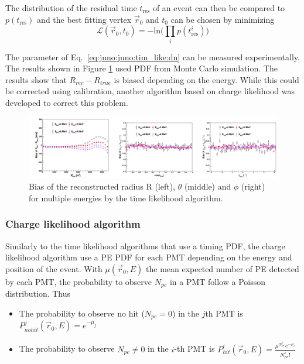 \documentclass[../main.tex]{subfiles}
\begin{document}
The distribution of the residual time $t_{\mathrm{res}}$ of an event can then be compared to $p(t_{\mathrm{res}})$ and the best fitting vertex $\vec{r}_0$ and $t_0$ can be chosen by minimizing
\begin{equation}
  \mathcal{L}(\vec{r}_0, t_0) = - \mathrm{ln} \bigg(\prod_i p(t^i_{\mathrm{res}}) \bigg)
\end{equation}

The parameter of Eq.\ \ref{eq:juno:juno:tim_like:dn} can be measured experimentally. The results shown in Figure \ref{fig:juno:rec:time_likelihood} used PDF from Monte Carlo simulation. The results show that $R_{rec} - R_{true}$ is biased depending on the energy. While this could be corrected using calibration, another algorithm based on charge likelihood was developed to correct this problem.

\begin{figure}[ht]
  \centering
  \includegraphics[width=\linewidth]{images/juno/reco/time_likelihood_results.png}
  \caption{Bias of the reconstructed radius R (left), $\theta$ (middle) and $\phi$ (right) for multiple energies by the time likelihood algorithm.}
  \label{fig:juno:rec:time_likelihood}
\end{figure}


\subsubsection{Charge likelihood algorithm}

Similarly to the time likelihood algorithms that use a timing PDF, the charge likelihood algorithm use a PE PDF for each PMT depending on the energy and position of the event. With $\mu(\vec{r}_0, E)$ the mean expected number of PE detected by each PMT, the probability to observe $N_{pe}$ in a PMT follow a Poisson distribution. Thus
\begin{itemize}
  \item The probability to observe no hit ($N_{pe} = 0$) in the $j$th PMT is $P^{j}_{nohit} (\vec{r}_0, E) = e^{-\mu_j}$
  \item The probability to observe $N_{pe} \neq 0$ in the $i$-th PMT is $P^{i}_{hit} (\vec{r}_0, E) = \frac{\mu^{N^i_{pe}} e^{-\mu_i}}{N^i_{pe}!}$
\end{itemize}
\end{document}
